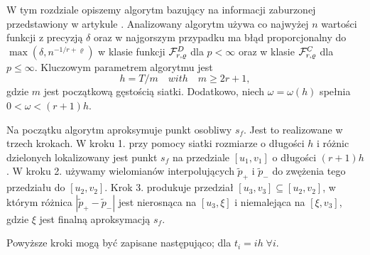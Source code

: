 \documentclass[oik, pdftex, robocza, man]{mgrwms}
\begin{document}
W tym rozdziale opiszemy algorytm bazujący na informacji zaburzonej przedstawiony w artykule \cite{AoP}. Analizowany algorytm używa co najwyżej $n$ wartości funkcji z precyzją $\delta $ oraz w najgorszym przypadku ma błąd proporcjonalny do $\max{(\delta, n^{-1 / r + \varrho })}$ w klasie funkcji $\mathcal{F}^D_{r,\varrho }$ dla $p < \infty$ oraz w klasie $\mathcal{F}^C_{r,\varrho }$ dla $p \leq \infty$. Kluczowym parametrem algorytmu jest
$$
    h = T / m \quad with \quad  m \geq 2r + 1,
$$
gdzie $m$ jest początkową gęstością siatki. Dodatkowo, niech $\omega  = \omega(h)$ spełnia $0 < \omega < (r + 1)h $.

Na początku algorytm aproksymuje punkt osobliwy $s_f$. Jest to realizowane w trzech krokach. W kroku 1. przy pomocy siatki rozmiarze o długości $h$ i różnic dzielonych lokalizowany jest punkt $s_f$ na przedziale $[u_1, v_1]$ o długości $(r + 1)h$. W kroku 2. używamy wielomianów interpolujących $\tilde{p}_+$ i $\tilde{p}_-$ do zwężenia tego przedziału do $[u_2, v_2]$. Krok 3. produkuje przedział $[u_3, v_3] \subseteq [u_2, v_2]$, w którym różnica $|\tilde{p}_{+} - \tilde{p}_{-}|$ jest nierosnąca na $[u_3, \xi]$ i niemalejąca na $[\xi, v_3]$, gdzie $\xi$ jest finalną aproksymacją $s_f$.

Powyższe kroki mogą być zapisane następująco; dla $t_i = ih \; \forall i$. \vspace{10pt}
\end{document}
